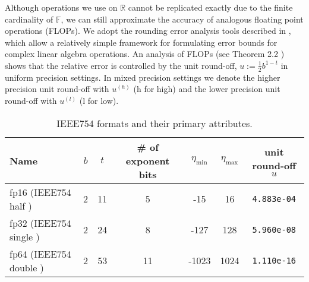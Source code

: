 \documentclass[review,onefignum,onetabnum]{siamart190516}
\newcommand{\R}{\mathbb{R}}
\newcommand{\F}{\mathbb{F}}
\providecommand{\DIFadd}[1]{{\protect\color{blue} \sf #1}} %
\providecommand{\DIFaddbegin}{} %
\providecommand{\DIFaddend}{} %
\providecommand{\DIFdelend}{} %
\providecommand{\DIFaddFL}[1]{\DIFadd{#1}} %
\providecommand{\DIFaddbeginFL}{} %
\providecommand{\DIFaddendFL}{} %
\providecommand{\DIFdelbeginFL}{} %
\providecommand{\DIFdelendFL}{} %
\begin{document}
\DIFdelend %
\DIFaddbegin \DIFadd{Although operations we use on $\R$ cannot be replicated exactly due to the finite cardinality of $\F$, we can still approximate the accuracy of analogous floating point operations (FLOPs).
We adopt the rounding error analysis tools described in \cite{Higham2002}, which allow a relatively simple framework for formulating error bounds for complex linear algebra operations. 
An analysis of FLOPs (see Theorem 2.2 \cite{Higham2002}) shows that the relative error is 
controlled by the unit round-off, $u:=\frac{1}{2}b^{1-t}$ in uniform precision settings. 
In mixed precision settings we denote the higher precision unit round-off with $u^{(h)}$ (h for high) and the lower precision unit round-off with $u^{(l)}$ (l for low).}\par 
\vspace{-.3cm}
\begin{table}[H]
	\DIFaddendFL \begin{tabular}{||l|c|c|c|c|c|c||} 
		\hline 
		Name & $b$ & $t$ & \# of exponent bits & $\eta_{\text{min}}$ & $\eta_{\text{max}}$ & unit round-off $u$ \\ \hline 
		\DIFaddbeginFL \DIFaddFL{fp16 (}\DIFaddendFL IEEE754 half\DIFaddbeginFL \DIFaddFL{)}\DIFaddendFL & 2 & 11 & 5 & -15 & 16  & {\tt 4.883e-04} \\ \hline 
		\DIFaddbeginFL \DIFaddFL{fp32 (}\DIFaddendFL IEEE754 single\DIFaddbeginFL \DIFaddFL{)}\DIFaddendFL & 2 & 24 & 8 & -127 & 128  & {\tt 5.960e-08} \\ \hline 
		\DIFaddbeginFL \DIFaddFL{fp64 (}\DIFaddendFL IEEE754 double\DIFaddbeginFL \DIFaddFL{)}\DIFaddendFL & 2 & 53 & 11 & -1023 & 1024 & {\tt 1.110e-16} \\ \hline 
	\end{tabular}
	\DIFdelbeginFL %
\DIFdelendFL %
	\DIFaddbeginFL \caption{\DIFaddFL{IEEE754 formats and their primary attributes.}} %
	\label{table:ieee}
\end{table}
\vspace{-.8cm}
\DIFaddend 
\end{document}
